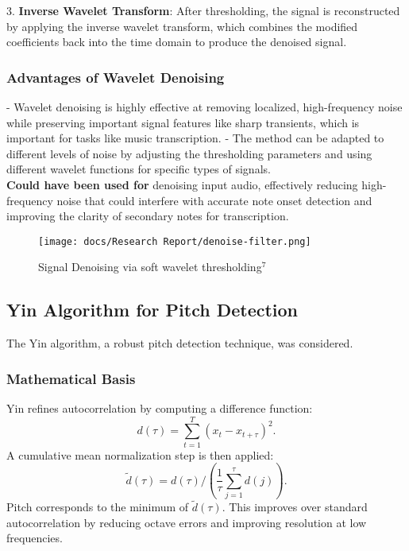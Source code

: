\documentclass{article}
\begin{document}
3. \textbf{Inverse Wavelet Transform}: After thresholding, the signal is reconstructed by applying the inverse wavelet transform, which combines the modified coefficients back into the time domain to produce the denoised signal.

\subsubsection{Advantages of Wavelet Denoising}
- Wavelet denoising is highly effective at removing localized, high-frequency noise while preserving important signal features like sharp transients, which is important for tasks like music transcription.
- The method can be adapted to different levels of noise by adjusting the thresholding parameters and using different wavelet functions for specific types of signals. \\

\textbf{Could have been used for} denoising input audio, effectively reducing high-frequency noise that could interfere with accurate note onset detection and improving the clarity of secondary notes for transcription.

\begin{figure}[h]
\texttt{[image: docs/Research Report/denoise-filter.png]}
\caption{ Signal Denoising via soft wavelet thresholding$^7$}
\end{figure}

\newpage



\subsection{Yin Algorithm for Pitch Detection}
The Yin algorithm, a robust pitch detection technique, was considered.

\subsubsection{Mathematical Basis}
Yin refines autocorrelation by computing a difference function:
\begin{equation}
d(\tau) = \sum_{t=1}^{T} (x_t - x_{t+\tau})^2.
\end{equation}
A cumulative mean normalization step is then applied:
\begin{equation}
\tilde{d}(\tau) = d(\tau) / \left(\frac{1}{\tau} \sum_{j=1}^{\tau} d(j) \right).
\end{equation}
Pitch corresponds to the minimum of $\tilde{d}(\tau)$. This improves over standard autocorrelation by reducing octave errors and improving resolution at low frequencies. \\
\end{document}
